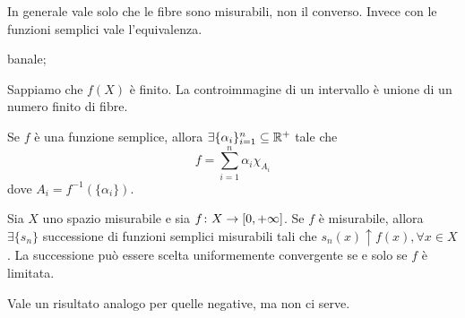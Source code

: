 \documentclass[a4paper]{article}
\begin{document}
\begin{radioactive}
In generale vale solo che le fibre sono misurabili, non il converso.
Invece con le funzioni semplici vale l'equivalenza.
\end{radioactive}

\begin{radioactive}
\begin{snippetproof}{}
    \begin{iffproof}
    \item banale;
    \item Sappiamo che \(f(X)\) è finito.
        La controimmagine di un intervallo è unione di un numero finito di fibre.
    \end{iffproof}
\end{snippetproof}
\end{radioactive}

\begin{radioactive}
Se \(f\) è una funzione semplice, allora \(\exists \{\alpha_i\}_{i=1}^n \subseteq \mathbb{R}^+\)
tale che
\[
    f = \sum_{i=1}^n \alpha_i \chi_{A_i}
\]
dove \(A_i = f^{-1}(\{\alpha_i\})\).
\end{radioactive}

\begin{radioactive}
\begin{snippettheorem}{}
    Sia \(X\) uno spazio misurabile e sia \(f \colon X \to [0,+\infty]\).
    Se \(f\) è misurabile, allora \(\exists \{s_n\}\)
    successione di funzioni semplici misurabili tali che
    \(s_n(x) \uparrow f(x), \forall x \in X\). La successione può essere scelta
    uniformemente convergente se e solo se \(f\) è limitata.
\end{snippettheorem}
\end{radioactive}

\begin{radioactive}
Vale un risultato analogo per quelle negative, ma non ci serve.
\end{radioactive}

\pagebreak
\end{document}
